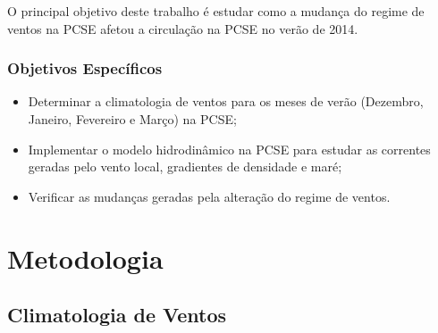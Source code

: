 O principal objetivo deste trabalho é estudar como a mudança do regime de ventos
na PCSE afetou a circulação na PCSE no verão de 2014.

\subsubsection{Objetivos Específicos}
\label{sub:objespec}

\begin{itemize}
    \item Determinar a climatologia de ventos para os meses de verão (Dezembro, Janeiro, Fevereiro e Março) na PCSE;
    \item Implementar o modelo hidrodinâmico na PCSE para estudar as correntes geradas pelo vento local, gradientes
    de densidade e maré;
    \item Verificar as mudanças geradas pela alteração do regime de ventos.
\end{itemize}

\section{Metodologia} %
\label{sec:metodos}





\subsection{Climatologia de Ventos}
\label{sub:climatologia}



